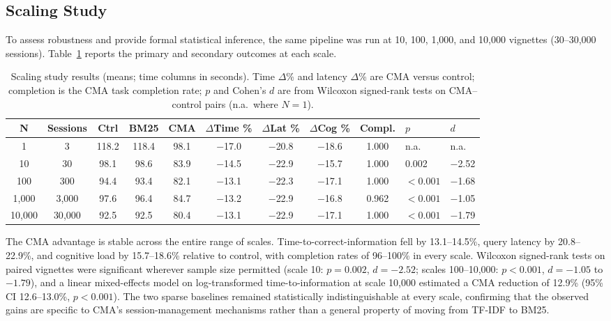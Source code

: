\documentclass[preprint,12pt]{elsarticle}
\begin{document}
\subsection{Scaling Study}
To assess robustness and provide formal statistical inference, the same pipeline was run at 10, 100, 1{,}000, and 10{,}000 vignettes (30--30{,}000 sessions). Table~\ref{tab:scaling} reports the primary and secondary outcomes at each scale.

\begin{table}[htbp]
\centering
\caption{Scaling study results (means; time columns in seconds). Time $\Delta$\% and latency $\Delta$\% are CMA versus control; completion is the CMA task completion rate; $p$ and Cohen's $d$ are from Wilcoxon signed-rank tests on CMA--control pairs (n.a.\ where $N=1$).}
\label{tab:scaling}
\scriptsize
\setlength{\tabcolsep}{2pt}
\begin{tabular}{cccccccccll}
\toprule
\textbf{N} & \textbf{Sessions} & \textbf{Ctrl} & \textbf{BM25} & \textbf{CMA} & \textbf{$\Delta$Time \%} & \textbf{$\Delta$Lat \%} & \textbf{$\Delta$Cog \%} & \textbf{Compl.} & $p$ & $d$ \\
\midrule
1          & 3        & 118.2 & 118.4 & 98.1  & $-$17.0 & $-$20.8 & $-$18.6 & 1.000 & n.a. & n.a. \\
10         & 30       & 98.1  & 98.6  & 83.9  & $-$14.5 & $-$22.9 & $-$15.7 & 1.000 & 0.002 & $-$2.52 \\
100        & 300      & 94.4  & 93.4  & 82.1  & $-$13.1 & $-$22.3 & $-$17.1 & 1.000 & $<0.001$ & $-$1.68 \\
1{,}000    & 3{,}000    & 97.6  & 96.4  & 84.7  & $-$13.2 & $-$22.9 & $-$16.8 & 0.962 & $<0.001$ & $-$1.05 \\
10{,}000   & 30{,}000   & 92.5  & 92.5  & 80.4  & $-$13.1 & $-$22.9 & $-$17.1 & 1.000 & $<0.001$ & $-$1.79 \\
\bottomrule
\end{tabular}
\end{table}

The CMA advantage is stable across the entire range of scales. Time-to-correct-information fell by 13.1--14.5\%, query latency by 20.8--22.9\%, and cognitive load by 15.7--18.6\% relative to control, with completion rates of 96--100\% in every scale. Wilcoxon signed-rank tests on paired vignettes were significant wherever sample size permitted (scale 10: $p = 0.002$, $d = -2.52$; scales 100--10{,}000: $p < 0.001$, $d = -1.05$ to $-1.79$), and a linear mixed-effects model on log-transformed time-to-information at scale 10{,}000 estimated a CMA reduction of 12.9\% (95\% CI 12.6--13.0\%, $p < 0.001$). The two sparse baselines remained statistically indistinguishable at every scale, confirming that the observed gains are specific to CMA's session-management mechanisms rather than a general property of moving from TF-IDF to BM25.
\end{document}
